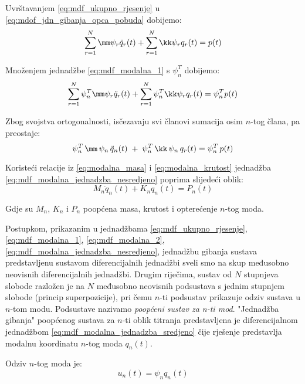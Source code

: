 Uvrštavanjem \eqref{eq:mdf_ukupno_rjesenje} u \eqref{eq:mdof_jdn_gibanja_opca_pobuda} 
dobijemo:
\begin{equation}\label{eq:mdf_modalna_1}
    \sum_{r=1}^N\mm\psi_r\ddot{q}_r(t) + \sum_{r=1}^N\kk\psi_rq_r(t)=p(t)
\end{equation}

Množenjem jednadžbe \eqref{eq:mdf_modalna_1} s $\psi_n^T$ dobijemo:
\begin{equation}\label{eq:mdf_modalna_2}
    \sum_{r=1}^N\psi_n^T\mm\psi_r\ddot{q}_r(t)+\sum_{r=1}^N\psi_n^T\kk\psi_rq_r(t)=\psi_n^Tp(t)
\end{equation}

Zbog svojstva ortogonalnosti, isčezavaju svi članovi sumacija osim $n$-tog člana, pa
preostaje:
\begin{equation}\label{eq:mdf_modalna_jednadzba_nesredjeno}
    \psi_n^T\,\mm\,\psi_n\,\ddot{q}_n(t)\;+\;\psi_n^T\,\kk\,\psi_n\,q_r(t)=\psi_n^T\,p(t)
\end{equation}

Koristeći relacije iz \eqref{eq:modalna_masa} i \eqref{eq:modalna_krutost} jednadžba
\eqref{eq:mdf_modalna_jednadzba_nesredjeno} poprima slijedeći oblik:
\begin{equation}\label{eq:mdf_modalna_jednadzba_sredjeno}
    M_n\ddot{q}_n(t)+K_nq_n(t)=P_n(t)
\end{equation}

Gdje su $M_n$, $K_n$ i $P_n$ poopćena masa, krutost i opterećenje $n$-tog moda.

Postupkom, prikazanim u jednadžbama \eqref{eq:mdf_ukupno_rjesenje},
\eqref{eq:mdf_modalna_1}, \eqref{eq:mdf_modalna_2},
\eqref{eq:mdf_modalna_jednadzba_nesredjeno}, jednadžbu gibanja sustava predstavljenu
sustavom diferencijalnih jednadžbi sveli smo na skup međusobno neovisnih
diferencijalnih jednadžbi. Drugim riječima, sustav od $N$ stupnjeva slobode razložen
je na $N$ međusobno neovisnih podsustava s jednim stupnjem slobode (princip superpozicije), 
pri čemu $n$-ti podsustav prikazuje odziv sustava u $n$-tom modu. Podsustave 
nazivamo \textit{poopćeni sustav za n-ti mod}. "Jednadžba gibanja" 
poopćenog sustava za $n$-ti oblik titranja predstavljena je diferencijalnom jednadžbom
\eqref{eq:mdf_modalna_jednadzba_sredjeno} čije rješenje predstavlja modalnu 
koordinatu $n$-tog moda $q_n(t)$.
\par

Odziv $n$-tog moda je:
\begin{equation}\label{eq:mdf_odziv_ntog_moda}
    u_n(t)=\psi_nq_n(t)
\end{equation}

